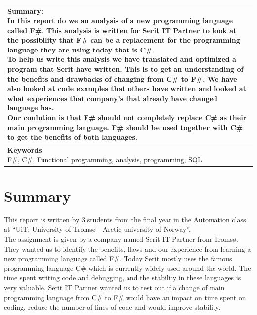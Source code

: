 \documentclass[12pt, a4paper]{article}
\begin{document}
\begin{tabularx}{\textwidth}{|X|}
\hline
\pbox{\linewidth}{
\vspace{1mm}
\textbf{Summary:}\\
In this report do we an analysis of a new programming language called F\#. This analysis is written for Serit IT Partner  to look at the possibility that F\# can be a replacement for the programming language they are using today that is C\#.\\[2mm]
To help us write this analysis we have translated and optimized a program that Serit have written. This is to get an understanding of the benefits and drawbacks of changing from C\# to F\#. We have also looked at code examples that others have written and looked at what experiences that company's that already have changed language has.\\[2mm]
Our conlution is that F\# should not completely replace C\# as their main programming language. F\# should be used together with C\# to get the benefits of both languages. 
\vspace{1mm}
}
\\
\hline
\pbox{\linewidth}{
\vspace{1mm}
\textbf{Keywords:}\\
F\#, C\#, Functional programming, analysis, programming, SQL
\vspace{1mm}
}
\\

\hline
\end{tabularx}


\newpage
\section*{Summary}
This report is written by 3 students from the final year in the Automation class at “UiT: University of Tromsø - Arctic university of Norway”.\\

The assignment is given by a company named Serit IT Partner from Tromsø. They wanted us to identify the benefits, flaws and our experience from learning a new programming language called F\#. Today Serit mostly uses the famous programming language C\# which is currently widely used around the world. The time spent writing code and debugging, and the stability in these languages is very valuable. Serit IT Partner wanted us to test out if a change of main programming language from C\# to F\# would have an impact on time spent on coding, reduce the number of lines of code and would improve stability.\\
\end{document}
